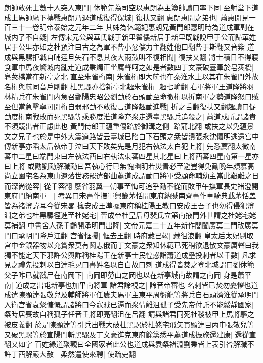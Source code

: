 朗帥敢死士數十人突入東門|{
	休範先為司空以惠朗為主簿帥讀曰率下同}
至射堂下道成上馬帥麾下摶戰惠朗乃退道成復得保城|{
	復扶又翻}
惠朗惠開之弟也|{
	蕭惠開見一百三十一卷明帝泰始之元年二年}
其姊為休範妃惠朗兄黃門郎惠明時為道成軍副在城内了不自疑|{
	左傳宋元公與華氏戰于新里翟僂新居于新里既戰說甲于公而歸華姓居于公里亦如之杜預注曰古之為軍不呰小忿僂力主翻姓他口翻呰于斯翻又音紫}
道成與黑騾拒戰自晡逹旦矢石不息其夜大雨鼓叫不復相聞|{
	復扶又翻}
將士積日不得寢食軍中馬夜驚城内亂走道成秉燭正坐厲聲呵之如是者數四丁文豪破臺軍於皂莢橋|{
	皂莢橋當在新亭之北}
直至朱雀桁南|{
	朱雀桁即大航也在秦淮水上以其在朱雀門外故名桁與航同音戶剛翻}
杜黑騾亦捨新亭北趣朱雀桁|{
	趣七喻翻}
右軍將軍王道隆將羽林精兵在朱雀門内急召鄱陽忠昭公劉勔於石頭勔至命撤桁以折南軍之勢道隆怒曰賊至但當急擊寧可開桁自弱邪勔不敢復言道隆趣勔進戰|{
	折之舌翻復扶又翻趣讀曰促}
勔度桁南戰敗而死黑騾等乘勝度淮道隆弃衆走還臺黑騾兵追殺之|{
	蕭道成所謂諸貴不須競出者正慮此也}
黃門侍郎王藴重傷踣於御溝之側|{
	踣蒲北翻}
或扶之以免藴景文之兄子也於是中外大震道路皆云臺城已陷白下石頭之衆皆潰張永沈懷明逃還宫中傳新亭亦䧟太后執帝手泣曰天下敗矣先是月犯右執法太白犯上將|{
	先悉薦翻太微南蕃中二星曰端門東曰左執法西曰右執法東蕃四星其北星曰上將西蕃四星南第一星亦曰上將}
或勸劉勔解職勔曰吾執心行已無愧幽明若災眚必至避豈得免勔晩年頗慕高尚立園宅名為東山遺落世務罷遣部曲蕭道成謂勔曰將軍受顧命輔幼主當此艱難之日而深尚從容|{
	從千容翻}
廢省羽翼一朝事至悔可追乎勔不從而敗甲午撫軍長史禇澄開東府門納南軍　|{
	考異曰宋書作撫軍興籖茅恬開東府納賊南齊書作車騎典韯茅恬盖皆為禇澄諱耳今從宋畧}
擁安成王凖據東府稱桂陽王教曰安成王吾子也勿得侵犯澄淵之弟也杜黑騾徑進至杜姥宅|{
	晉成帝杜皇后母裴氏立第南掖門外世謂之杜姥宅姥莫補翻}
中書舍人孫千齡開承明門出降|{
	文帝元嘉二十五年新作閭闔廣莫二門改廣莫門曰承明門降戶江翻}
宫省恇擾|{
	恇去王翻}
時府藏已竭|{
	藏徂浪翻}
皇太后太妃剔取宫中金銀器物以充賞衆莫有鬭志俄而丁文豪之衆知休範已死稍欲退散文豪厲聲曰我獨不能定天下邪許公輿詐稱桂陽王在新亭士民惶惑詣蕭道成壘投刺者以千數|{
	凡求見之禮先投刺以自逹毛晃曰書姓名以自白故曰刺}
道成得皆焚之登北城謂曰劉休範父子昨已就戮尸在南岡下|{
	南岡即勞山之岡也以在新亭城南故謂之南岡}
身是蕭平南|{
	道成之出屯新亭也加平南將軍}
諸君諦視之|{
	諦音帝審也}
名刺皆已焚勿憂懼也道成遣陳顯逹張敬兒及輔師將軍任農夫馬軍主東平周盤龍等將兵自石頭濟淮從承明門入衛宫省袁粲慷慨謂諸將曰今寇賊已逼而衆情離沮孤子受先帝付託不能綏靜國家|{
	粲時居喪故自稱孤子任音壬將即亮翻沮在呂翻}
請與諸君同死社稷被甲上馬將驅之|{
	被皮義翻}
於是陳顯逹等引兵出戰大破杜黑騾於杜姥宅飛矢貫顯逹目丙申張敬兒等又破黑騾等於宣陽門斬黑騾及丁文豪進克東府餘黨悉平蕭道成振旅還建康|{
	還從宣翻又如字}
百姓緣道聚觀曰全國家者此公也道成與袁粲褚淵劉秉皆上表引咎解職不許丁酉解嚴大赦　柔然遣使來聘|{
	使疏吏翻}
